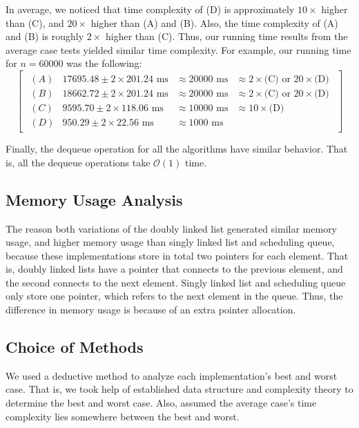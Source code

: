 \documentclass[a4paper,11pt]{kth-mag}
\newcommand*{\skippara}{\par\vspace{\baselineskip} \noindent}
\begin{document}
\skippara In average, we noticed that time complexity of (D) is approximately $10\times$ higher than (C), and $20\times$ higher than (A) and (B).
Also, the time complexity of (A) and (B) is roughly $2\times$ higher than (C).
Thus, our running time results from the average case tests yielded similar time complexity.
For example, our running time for $n=60000$ was the following:
\begin{equation*}
    \begin{bmatrix*}
        \begin{array}{llllll}
            (A) & 17695.48 \pm 2\times 201.24 \text{ ms} & \approx 20000 \text{ ms}  & \approx 2\times\text{(C)}\text{ or } 20\times\text{(D)} \\[1ex]
            (B) & 18662.72 \pm 2\times 201.24 \text{ ms} & \approx 20000 \text{ ms}  & \approx 2\times\text{(C)}\text{ or } 20\times\text{(D)} \\[1ex]
            (C) & 9595.70 \pm 2\times 118.06 \text{ ms} & \approx 10000 \text{ ms} & \approx 10\times\text{(D)} \\[1ex]
            (D) & 950.29 \pm 2\times 22.56 \text{ ms} & \approx 1000 \text{ ms} &
        \end{array}
    \end{bmatrix*}
\end{equation*}

\skippara Finally, the dequeue operation for all the algorithms have similar behavior.
That is, all the dequeue operations take $\mathcal{O}(1)$ time.

\subsection{Memory Usage Analysis}
The reason both variations of the doubly linked list generated similar memory usage, and higher memory usage than singly linked list and scheduling queue, because these implementations store in total two pointers for each element.
That is, doubly linked lists have a pointer that connects to the previous element, and the second connects to the next element.
Singly linked list and scheduling queue only store one pointer, which refers to the next element in the queue.
Thus, the difference in memory usage is because of an extra pointer allocation.

\subsection{Choice of Methods}
We used a deductive method to analyze each implementation's best and worst case.
That is, we took help of established data structure and complexity theory to determine the best and worst case.
Also, assumed the average case's time complexity lies somewhere between the best and worst.
\end{document}
